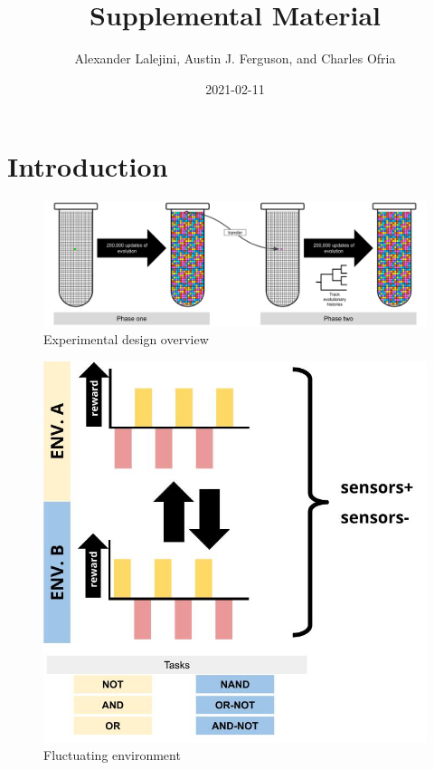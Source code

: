 \documentclass[]{book}
\title{Supplemental Material}
\author{Alexander Lalejini, Austin J. Ferguson, and Charles Ofria}
\date{2021-02-11}
\begin{document}
\maketitle

{
\setcounter{tocdepth}{1}
\tableofcontents
}
\hypertarget{introduction}{%
\chapter{Introduction}\label{introduction}}

\begin{figure}
\centering
\includegraphics{media/experimental-design-overview.png}
\caption{Experimental design overview}
\end{figure}

\begin{figure}
\centering
\includegraphics{media/fluctuating-environment.jpg}
\caption{Fluctuating environment}
\end{figure}
\end{document}
